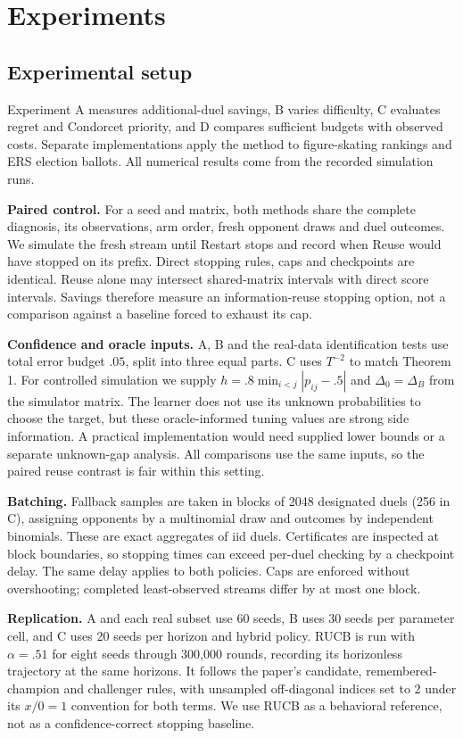 \documentclass[11pt,a4paper]{article}
\begin{document}
\section{Experiments}
\subsection{Experimental setup}

Experiment A measures additional-duel savings, B varies difficulty, C evaluates regret and Condorcet priority, and D compares sufficient budgets with observed costs. Separate implementations apply the method to figure-skating rankings and ERS election ballots. All numerical results come from the recorded simulation runs.

\textbf{Paired control.} For a seed and matrix, both methods share the complete diagnosis, its observations, arm order, fresh opponent draws and duel outcomes. We simulate the fresh stream until Restart stops and record when Reuse would have stopped on its prefix. Direct stopping rules, caps and checkpoints are identical. Reuse alone may intersect shared-matrix intervals with direct score intervals. Savings therefore measure an information-reuse stopping option, not a comparison against a baseline forced to exhaust its cap.

\textbf{Confidence and oracle inputs.} A, B and the real-data identification tests use total error budget $.05$, split into three equal parts. C uses $T^{-2}$ to match Theorem 1. For controlled simulation we supply $h=.8\min_{i<j}|p_{ij}-.5|$ and $\Delta_0=\Delta_B$ from the simulator matrix. The learner does not use its unknown probabilities to choose the target, but these oracle-informed tuning values are strong side information. A practical implementation would need supplied lower bounds or a separate unknown-gap analysis. All comparisons use the same inputs, so the paired reuse contrast is fair within this setting.

\textbf{Batching.} Fallback samples are taken in blocks of 2048 designated duels (256 in C), assigning opponents by a multinomial draw and outcomes by independent binomials. These are exact aggregates of iid duels. Certificates are inspected at block boundaries, so stopping times can exceed per-duel checking by a checkpoint delay. The same delay applies to both policies. Caps are enforced without overshooting; completed least-observed streams differ by at most one block.

\textbf{Replication.} A and each real subset use 60 seeds, B uses 30 seeds per parameter cell, and C uses 20 seeds per horizon and hybrid policy. RUCB is run with $\alpha=.51$ for eight seeds through 300,000 rounds, recording its horizonless trajectory at the same horizons. It follows the paper's candidate, remembered-champion and challenger rules, with unsampled off-diagonal indices set to 2 under its $x/0=1$ convention for both terms. We use RUCB as a behavioral reference, not as a confidence-correct stopping baseline.
\end{document}
